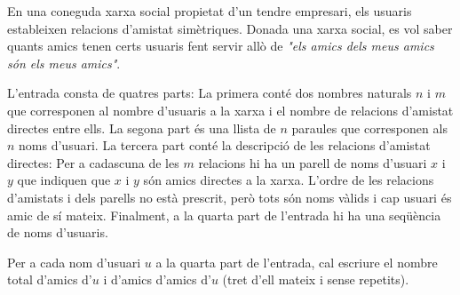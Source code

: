 
\UsePython

\Statement

En una coneguda xarxa social propietat d'un tendre empresari, els usuaris estableixen relacions d'amistat simètriques. Donada una xarxa social, es vol saber quants amics tenen certs usuaris fent servir allò de \emph{"els amics dels meus amics són els meus amics"}.

\Input

L'entrada consta de quatres parts: La primera conté dos nombres naturals $n$ i $m$ que corres\-ponen al nombre d'usuaris a la xarxa i el nombre de relacions d'amistat directes entre ells. La segona part és una llista de $n$ paraules que corresponen als $n$ noms d'usuari. La tercera part conté la descripció de les relacions d'amistat directes: Per a cadascuna de les $m$ relacions hi ha un parell de noms d'usuari $x$ i $y$ que indiquen que $x$ i $y$ són amics directes a la xarxa. L'ordre de les relacions d'amistats i dels parells no està prescrit, però tots són noms vàlids i cap usuari és amic de sí mateix. Finalment, a la quarta part de l'entrada hi ha una seqüència de noms d'usuaris.

\Output

Per a cada nom d'usuari $u$ a la quarta part de l'entrada, cal escriure el nombre total d'amics d'$u$ i d'amics d'amics d'$u$ (tret d'ell mateix
i sense repetits).

\Sample